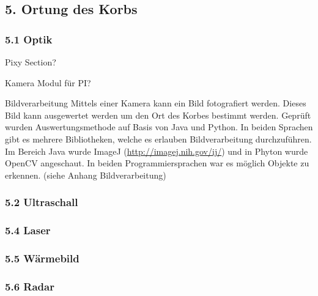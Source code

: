 \subsection{5. Ortung des Korbs}

\subsubsection{5.1 Optik}

Pixy Section?

Kamera Modul für PI?

Bildverarbeitung
Mittels einer Kamera kann ein Bild fotografiert werden. Dieses Bild kann ausgewertet werden um den Ort des Korbes bestimmt werden. Geprüft wurden Auswertungsmethode auf Basis von Java und Python. In beiden Sprachen gibt es mehrere Bibliotheken, welche es erlauben Bildverarbeitung durchzuführen. Im Bereich Java wurde ImageJ (\href{http://imagej.nih.gov/ij/}{http://imagej.nih.gov/ij/}) und in Phyton wurde OpenCV  angeschaut. In beiden Programmiersprachen war es möglich Objekte zu erkennen. (siehe Anhang Bildverarbeitung)

\subsubsection{5.2 Ultraschall}

\subsubsection{5.4 Laser}

\subsubsection{5.5 Wärmebild}

\subsubsection{5.6 Radar}